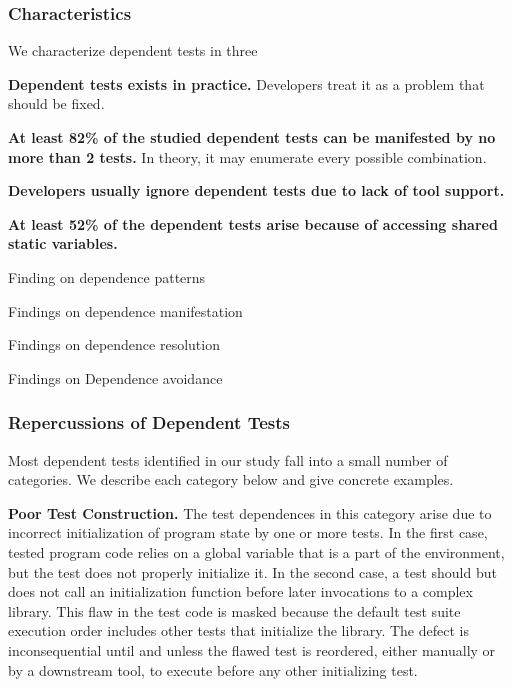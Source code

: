 \subsubsection{Characteristics}

We characterize dependent tests in three

\noindent \textbf{{Dependent tests exists in practice.}}
Developers treat it as a problem that should be fixed.

\vspace{1mm}
\noindent \textbf{{At least 82\% of the studied dependent
tests can be manifested by no more than 2 tests.}} In theory,
it may enumerate every possible combination.

\vspace{1mm}
\noindent \textbf{{Developers usually ignore dependent
tests due to lack of tool support.}}

\vspace{1mm}
\noindent \textbf{{At least 52\% of the dependent tests arise
because of accessing shared static variables.}}

Finding on dependence patterns

Findings on dependence manifestation

Findings on dependence resolution

Findings on Dependence avoidance



\subsubsection{Repercussions of Dependent Tests}

Most dependent tests identified in our study fall into a small
number of categories. We describe each category below and give
concrete examples. 

\vspace{1mm}

\noindent \textbf{Poor Test Construction.}
The test dependences in this category arise due to incorrect initialization
of program state by one or more tests. In the first case,
tested program code relies on a
global variable that is a part of the environment, but the test does
not properly initialize it.  In the second case, a test should but
does not call
an initialization function before later invocations to a complex library.
This flaw in the test code is masked because the default test suite execution
order includes other tests that initialize the library.  The defect is
inconsequential until and unless the flawed test is reordered, either manually or by
a downstream tool, to execute before any other initializing test.


